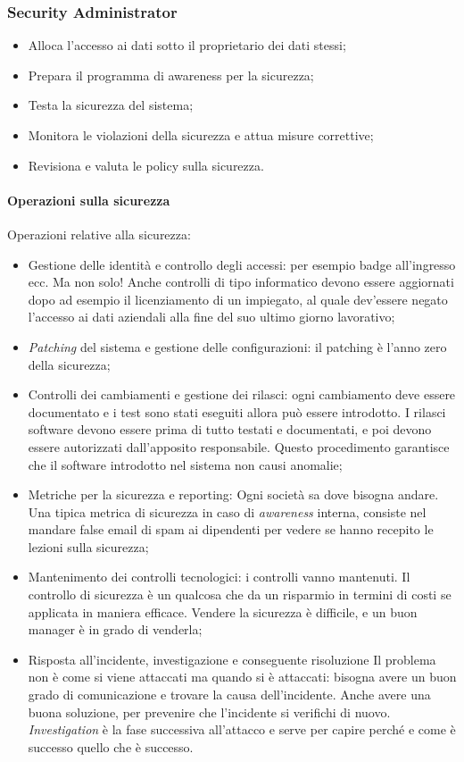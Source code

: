 \subsubsection{Security Administrator}

\begin{itemize}
\item Alloca l'accesso ai dati sotto il proprietario dei dati stessi;
\item Prepara il programma di awareness per la sicurezza;
\item Testa la sicurezza del sistema;
\item Monitora le violazioni della sicurezza e attua misure correttive;
\item Revisiona e valuta le policy sulla sicurezza.
\end{itemize}

\paragraph*{Operazioni sulla sicurezza}
\label{SA:SO}
Operazioni relative alla sicurezza:
\begin{itemize}
\item Gestione delle identità e controllo degli accessi: per esempio badge
all'ingresso ecc. Ma non solo! Anche controlli di tipo informatico devono
essere aggiornati dopo ad esempio il licenziamento di un impiegato, al quale
dev'essere negato l'accesso ai dati aziendali alla fine del suo ultimo giorno
lavorativo;
\item \textit{Patching} del sistema e gestione delle configurazioni: il
patching è l'anno zero della sicurezza;
\item Controlli dei cambiamenti e gestione dei rilasci: ogni cambiamento deve
essere documentato e i test sono stati eseguiti allora può essere introdotto.
I rilasci software devono essere prima di tutto testati e documentati, e poi
devono essere autorizzati dall'apposito responsabile. Questo procedimento
garantisce che il software introdotto nel sistema non causi anomalie;
\item Metriche per la sicurezza e reporting: Ogni società sa dove bisogna
andare. Una tipica metrica di sicurezza in caso di \emph{awareness} interna,
consiste nel mandare false email di spam ai dipendenti per vedere se
hanno recepito le lezioni sulla sicurezza;
\item Mantenimento dei controlli tecnologici: i controlli vanno mantenuti.
Il controllo di sicurezza è un qualcosa che da un risparmio in termini di costi
se applicata in maniera efficace. Vendere la sicurezza è difficile, e un buon
manager è in grado di venderla;

\item Risposta all'incidente, investigazione e conseguente risoluzione
Il problema non è come si viene attaccati ma quando si è attaccati: bisogna
avere un buon grado di comunicazione e trovare la causa dell'incidente. Anche
avere una buona soluzione, per prevenire che l'incidente si verifichi di nuovo.
\textit{Investigation} è la fase successiva all'attacco e serve per capire
perché e come è successo quello che è successo.

\end{itemize}

